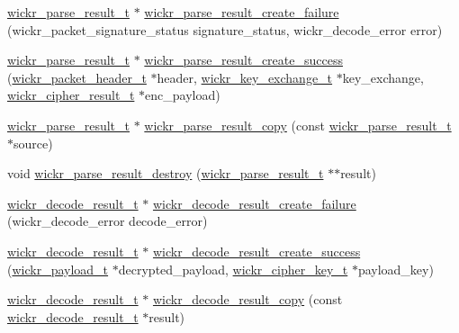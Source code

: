 \begin{DoxyCompactItemize}
\item 
\hyperlink{structwickr__parse__result}{wickr\+\_\+parse\+\_\+result\+\_\+t} $\ast$ \hyperlink{group__wickr__protocol_gac2673bcfeae2f8d693e523809bb6bb30}{wickr\+\_\+parse\+\_\+result\+\_\+create\+\_\+failure} (wickr\+\_\+packet\+\_\+signature\+\_\+status signature\+\_\+status, wickr\+\_\+decode\+\_\+error error)
\item 
\hyperlink{structwickr__parse__result}{wickr\+\_\+parse\+\_\+result\+\_\+t} $\ast$ \hyperlink{group__wickr__protocol_gae9d6837e2cea5b64993c124e671bd25f}{wickr\+\_\+parse\+\_\+result\+\_\+create\+\_\+success} (\hyperlink{structwickr__packet__header}{wickr\+\_\+packet\+\_\+header\+\_\+t} $\ast$header, \hyperlink{structwickr__key__exchange}{wickr\+\_\+key\+\_\+exchange\+\_\+t} $\ast$key\+\_\+exchange, \hyperlink{structwickr__cipher__result}{wickr\+\_\+cipher\+\_\+result\+\_\+t} $\ast$enc\+\_\+payload)
\item 
\hyperlink{structwickr__parse__result}{wickr\+\_\+parse\+\_\+result\+\_\+t} $\ast$ \hyperlink{group__wickr__protocol_ga1671066ddc19b38ed05d4460d5a96706}{wickr\+\_\+parse\+\_\+result\+\_\+copy} (const \hyperlink{structwickr__parse__result}{wickr\+\_\+parse\+\_\+result\+\_\+t} $\ast$source)
\item 
void \hyperlink{group__wickr__protocol_ga706d39419c8991f417f37f556cee8df9}{wickr\+\_\+parse\+\_\+result\+\_\+destroy} (\hyperlink{structwickr__parse__result}{wickr\+\_\+parse\+\_\+result\+\_\+t} $\ast$$\ast$result)
\item 
\hyperlink{structwickr__decode__result}{wickr\+\_\+decode\+\_\+result\+\_\+t} $\ast$ \hyperlink{group__wickr__protocol_ga2bd6f49ed993d2290aaafa514eba43ed}{wickr\+\_\+decode\+\_\+result\+\_\+create\+\_\+failure} (wickr\+\_\+decode\+\_\+error decode\+\_\+error)
\item 
\hyperlink{structwickr__decode__result}{wickr\+\_\+decode\+\_\+result\+\_\+t} $\ast$ \hyperlink{group__wickr__protocol_ga633aaf4cb6159be0110401f06dae458c}{wickr\+\_\+decode\+\_\+result\+\_\+create\+\_\+success} (\hyperlink{structwickr__payload}{wickr\+\_\+payload\+\_\+t} $\ast$decrypted\+\_\+payload, \hyperlink{structwickr__cipher__key}{wickr\+\_\+cipher\+\_\+key\+\_\+t} $\ast$payload\+\_\+key)
\item 
\hyperlink{structwickr__decode__result}{wickr\+\_\+decode\+\_\+result\+\_\+t} $\ast$ \hyperlink{group__wickr__protocol_ga36183bf96372661f890aefbe388bd32a}{wickr\+\_\+decode\+\_\+result\+\_\+copy} (const \hyperlink{structwickr__decode__result}{wickr\+\_\+decode\+\_\+result\+\_\+t} $\ast$result)
$$
\end{DoxyCompactItemize}
